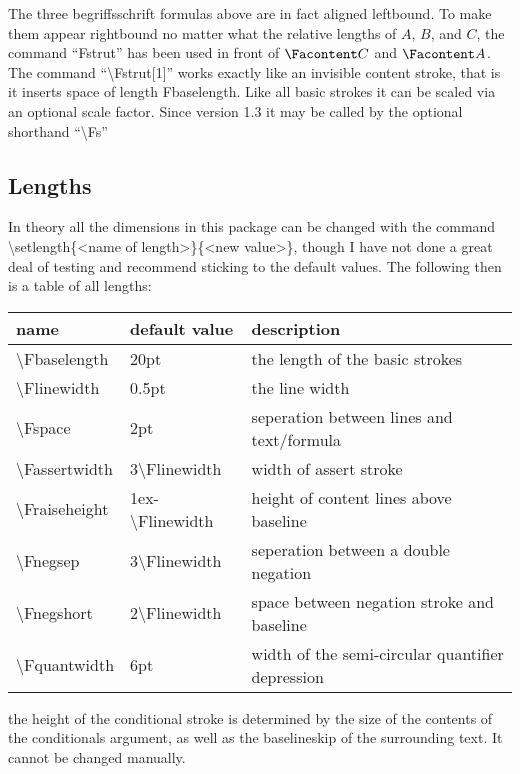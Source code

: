 \documentclass[12pt]{article}
\begin{document}
  The three begriffsschrift formulas above are in fact aligned leftbound. To make 
  them appear rightbound no matter what the relative lengths of $A$, $B$, and $C$, 
  the command ``Fstrut'' has been used in front of $\Facontent C$ and $\Facontent A$. 
  The command ``\textbackslash Fstrut[1]'' works exactly like an invisible content 
  stroke, that is it inserts space of length Fbaselength. Like all basic strokes it 
  can be scaled via an optional scale factor. Since version 1.3 it may be called by 
  the optional shorthand ``\textbackslash Fs''

\subsection{Lengths}
  In theory all the dimensions in this package can be changed with the command 
  \textbackslash setlength\{\textless name of length\textgreater\}\{\textless new 
  value\textgreater\}, though I have not done a great deal of testing and recommend 
  sticking to the default values. The following then is a table of all lengths: \\
  \begin{tabular}{|l|l|l|}
    \hline
    name & default value & description \\
    \hline
    \textbackslash Fbaselength & 20pt & the length of the basic strokes \\
    \textbackslash Flinewidth & 0.5pt & the line width \\
    \textbackslash Fspace & 2pt & seperation between lines and text/formula \\
    \textbackslash Fassertwidth & 3\textbackslash Flinewidth & width of assert 
    stroke \\
    \textbackslash Fraiseheight & 1ex-\textbackslash Flinewidth & height of content 
    lines above baseline \\
    \textbackslash Fnegsep & 3\textbackslash Flinewidth & seperation between a 
    double negation \\
    \textbackslash Fnegshort & 2\textbackslash Flinewidth & space between negation 
    stroke and baseline \\
    \textbackslash Fquantwidth & 6pt & width of the semi-circular quantifier 
    depression \\
    \hline
  \end{tabular}
  the height of the conditional stroke is determined by the size of the contents of 
  the conditionals argument, as well as the baselineskip of the surrounding text. It 
  cannot be changed manually.
\end{document}
